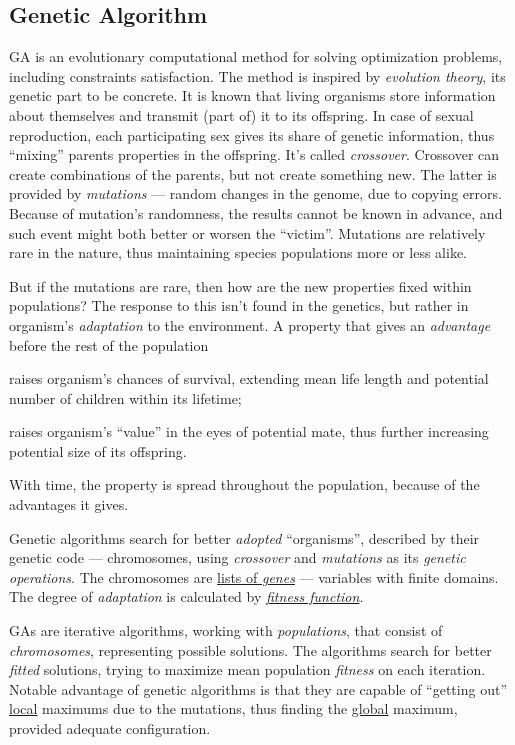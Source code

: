 \documentclass[../ThesisDoc]{subfiles}
\begin{document}
\providecommand{\rootdir}{..}



\subsection{Genetic Algorithm}
GA is an evolutionary computational method for solving optimization problems,
including constraints satisfaction. The method is inspired by \emph{evolution
theory}, its genetic part to be concrete. It is known that living organisms
store information about themselves and transmit (part of) it to its offspring.
In case of sexual reproduction, each participating sex gives its share of
genetic information, thus ``mixing'' parents properties in the offspring.
It's called \emph{crossover}.
Crossover can create combinations of the parents, but not create something new.
The latter is provided by \emph{mutations} --- random changes in the genome, due
to copying errors. Because of mutation's randomness, the results cannot be known
in advance, and such event might both better or worsen the ``victim''. Mutations
are relatively rare in the nature, thus maintaining species populations more or
less alike.

But if the mutations are rare, then how are the new properties fixed within
populations? The response to this isn't found in the genetics, but rather in
organism's \emph{adaptation} to the environment. A property that gives an
\emph{advantage} before the rest of the population
\begin{enumerate*}[1)]
  \item raises organism's chances of survival, extending mean life length and
        potential number of children within its lifetime;
  \item raises organism's ``value'' in the eyes of potential mate, thus further
        increasing potential size of its offspring.
\end{enumerate*}
With time, the property is spread throughout the population, because of the
advantages it gives.

\bigskip\noindent
Genetic algorithms search for better \emph{adopted} ``organisms'', described
by their genetic code --- chromosomes, using \emph{crossover} and \emph{mutations}
as its \emph{genetic operations}.
The chromosomes are \underline{lists of \emph{genes}} --- variables with finite
domains. The degree of \emph{adaptation} is calculated by
\underline{\emph{fitness function}}.

GAs are iterative algorithms, working with \emph{populations}, that consist of
\emph{chromosomes}, representing possible solutions. The algorithms search
for better \emph{fitted} solutions, trying to maximize mean population
\emph{fitness} on each iteration.
Notable advantage of genetic algorithms is that they are capable of
``getting out'' \underline{local} maximums due to the mutations, thus finding
the \underline{global} maximum, provided adequate configuration.
\end{document}
